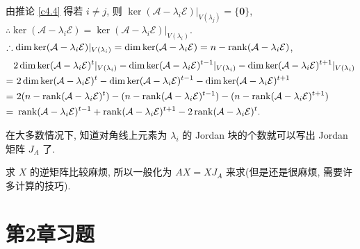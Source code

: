 \documentclass{ctexart}
\begin{document}
由推论 \ref{c4.4} 得若 $i\neq j$, 则 $\ker(\mathcal{A}-\lambda_i\mathcal{E})|_{V(\lambda_j)}=\{\boldsymbol{0}\}$, $\therefore\ker(\mathcal{A}-\lambda_i\mathcal{E})=\ker(\mathcal{A}-\lambda_i\mathcal{E})|_{V(\lambda_i)}$. $\therefore\dim\ker(\mathcal{A}-\lambda_i\mathcal{E})|_{V(\lambda_i)}=\dim\ker(\mathcal{A}-\lambda_i\mathcal{E})=n-\operatorname{rank} (\mathcal{A}-\lambda_i\mathcal{E})$,
\begin{align*}
    & 2\dim\ker(\mathcal{A}-\lambda_i\mathcal{E})^t|_{V(\lambda_i)}-\dim\ker(\mathcal{A}-\lambda_i\mathcal{E})^{t-1}|_{V(\lambda_i)}-\dim\ker(\mathcal{A}-\lambda_i\mathcal{E})^{t+1}|_{V(\lambda_i)} \\
    = &\ 2\dim\ker(\mathcal{A}-\lambda_i\mathcal{E})^t-\dim\ker(\mathcal{A}-\lambda_i\mathcal{E})^{t-1}-\dim\ker(\mathcal{A}-\lambda_i\mathcal{E})^{t+1} \\
    = &\ 2(n-\rank (\mathcal{A}-\lambda_i\mathcal{E})^t)-(n-\rank (\mathcal{A}-\lambda_i\mathcal{E})^{t-1})-(n-\rank (\mathcal{A}-\lambda_i\mathcal{E})^{t+1}) \\
    = &\ \rank (\mathcal{A}-\lambda_i\mathcal{E})^{t-1}+\rank (\mathcal{A}-\lambda_i\mathcal{E})^{t+1}-2\rank (\mathcal{A}-\lambda_i\mathcal{E})^t.
\end{align*}

在大多数情况下, 知道对角线上元素为 $\lambda_i$ 的 Jordan 块的个数就可以写出 Jordan 矩阵 $J_A$ 了.

求 $X$ 的逆矩阵比较麻烦, 所以一般化为 $AX=XJ_A$ 来求(但是还是很麻烦, 需要许多计算的技巧).
\section{第2章习题}
\end{document}
